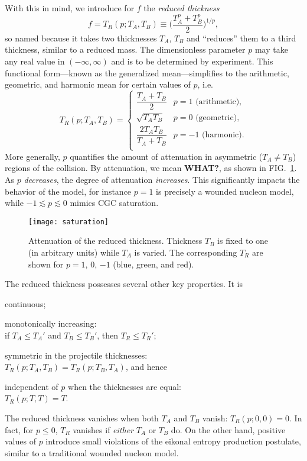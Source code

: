 \documentclass[aps,prl,reprint,amsmath,nofootinbib]{revtex4-1}
\begin{document}
With this in mind, we introduce for $f$ the \emph{reduced thickness}
\begin{equation}
  f = T_R(p; T_A, T_B) \equiv \biggl( \frac{T_A^p + T_B^p}{2} \biggr)^{1/p},
\end{equation}
so named because it takes two thicknesses $T_A$, $T_B$ and ``reduces'' them to a third thickness, similar to a
reduced mass.  The dimensionless parameter $p$ may take any real value in $(-\infty, \infty)$ and is to be
determined by experiment.  This functional form---known as the generalized mean---simplifies to the arithmetic,
geometric, and harmonic mean for certain values of $p$, i.e.
\begin{equation}
  T_R(p; T_A, T_B) =
  \begin{cases}
    \dfrac{T_A + T_B}{2} & p = 1 \text{ (arithmetic)}, \\[2ex]
    \sqrt{T_A T_B} & p = 0 \text{ (geometric)}, \\[2ex]
    \dfrac{2 T_A T_B}{T_A + T_B} & p = -1 \text{ (harmonic)}. \\
  \end{cases}
\end{equation}
More generally, $p$ quantifies the amount of attenuation in asymmetric ($T_A \neq T_B$) regions of the
collision.  By attenuation, we mean \textbf{WHAT?}, as shown in FIG.~\ref{fig:saturation}.  As $p$
\emph{decreases}, the degree of attenuation \emph{increases}.  This significantly impacts the behavior of the
model, for instance $p=1$ is precisely a wounded nucleon model, while $-1 \lesssim p \lesssim 0$ mimics CGC
saturation.

\begin{figure}[t]
  \texttt{[image: saturation]}
  \caption{
    \label{fig:saturation}
    Attenuation of the reduced thickness.  Thickness $T_B$ is fixed to one (in arbitrary units) while $T_A$ is
    varied.  The corresponding $T_R$ are shown for $p = 1$, 0, $-1$ (blue, green, and red).
  }
\end{figure}

The reduced thickness possesses several other key properties.  It is
\begin{itemize*}
  \item continuous;
  \item monotonically increasing:  \\
    if $T_A \leq T_A'$ and $T_B \leq T_B'$, then $T_R \leq T_R'$;
  \item symmetric in the projectile thicknesses: \\
    $T_R(p; T_A, T_B) = T_R(p; T_B, T_A)$, and hence
  \item independent of $p$ when the thicknesses are equal: \\
    $T_R(p; T, T) = T$.
  \item The reduced thickness vanishes when both $T_A$ and $T_B$ vanish: $T_R(p; 0, 0) = 0$.  In fact, for $p
    \leq 0$, $T_R$ vanishes if \emph{either} $T_A$ or $T_B$ do.  On the other hand, positive values of $p$
    introduce small violations of the eikonal entropy production postulate, similar to a traditional wounded
    nucleon model.
\end{itemize*}
\end{document}
